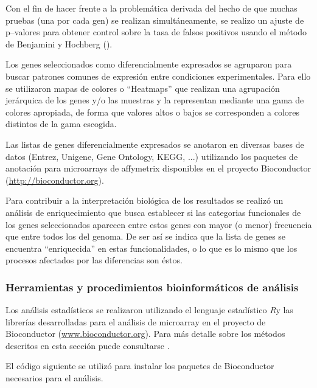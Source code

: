 \documentclass[a4paper]{article}\usepackage[]{graphicx}\usepackage[]{color}
\newcommand{\R}{{\it R}}
\begin{document}
Con el fin de hacer frente a la problemática derivada del hecho de que muchas pruebas (una por cada gen) se realizan simultáneamente, se realizo un ajuste de p--valores para obtener control sobre la tasa de falsos positivos usando el método de Benjamini y Hochberg (\cite{BenjaminiHochberg:1995}).



Los genes seleccionados como diferencialmente expresados se agruparon para buscar patrones comunes de expresión entre condiciones experimentales.
Para ello se utilizaron mapas de colores o ``Heatmaps'' que realizan una agrupación jerárquica de los genes y/o las muestras y la representan mediante una gama de colores apropiada, de forma que valores altos o bajos se corresponden a colores distintos de la gama escogida.

Las listas de genes diferencialmente expresados se anotaron en diversas bases de datos (Entrez, Unigene, Gene Ontology, KEGG, ...) utilizando los paquetes de anotación para microarrays de affymetrix disponibles en el proyecto Bioconductor (\url{http://bioconductor.org}).

Para contribuir a la interpretación biológica de los resultados se realizó un análisis de enriquecimiento \cite{Gentleman:2004, Falcon:2007} que busca establecer si las categorias funcionales de los genes seleccionados aparecen entre estos genes con mayor (o menor) frecuencia que entre todos los del genoma. De ser así se indica que la lista de genes se encuentra ``enriquecida'' en estas funcionalidades, o lo que es lo mismo que los procesos afectados por las diferencias son éstos.

\subsubsection{Herramientas y procedimientos  bioinformáticos de análisis}

Los análisis estadísticos se realizaron utilizando el lenguaje estadístico  \R  y las librerías  desarrolladas para el análisis de microarray en el proyecto de Bioconductor (\url{www.bioconductor.org}). Para más detalle sobre los métodos descritos en esta sección puede consultarse \cite{Gentleman:2005}.

El código siguiente se utilizó para instalar los paquetes de Bioconductor necesarios para el análisis.
\end{document}
